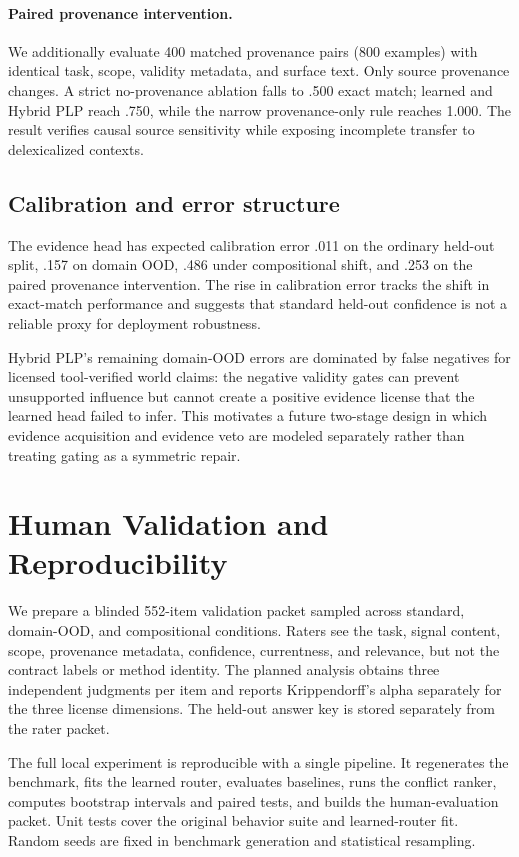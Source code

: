 \documentclass[10pt,twocolumn]{article}
\begin{document}
\paragraph{Paired provenance intervention.} We additionally evaluate 400 matched provenance pairs (800 examples) with identical task, scope, validity metadata, and surface text. Only source provenance changes. A strict no-provenance ablation falls to .500 exact match; learned and Hybrid PLP reach .750, while the narrow provenance-only rule reaches 1.000. The result verifies causal source sensitivity while exposing incomplete transfer to delexicalized contexts.


\subsection{Calibration and error structure}
The evidence head has expected calibration error .011 on the ordinary held-out split, .157 on domain OOD, .486 under compositional shift, and .253 on the paired provenance intervention. The rise in calibration error tracks the shift in exact-match performance and suggests that standard held-out confidence is not a reliable proxy for deployment robustness.

Hybrid PLP's remaining domain-OOD errors are dominated by false negatives for licensed tool-verified world claims: the negative validity gates can prevent unsupported influence but cannot create a positive evidence license that the learned head failed to infer. This motivates a future two-stage design in which evidence acquisition and evidence veto are modeled separately rather than treating gating as a symmetric repair.

\section{Human Validation and Reproducibility}
We prepare a blinded 552-item validation packet sampled across standard, domain-OOD, and compositional conditions. Raters see the task, signal content, scope, provenance metadata, confidence, currentness, and relevance, but not the contract labels or method identity. The planned analysis obtains three independent judgments per item and reports Krippendorff's alpha separately for the three license dimensions. The held-out answer key is stored separately from the rater packet.

The full local experiment is reproducible with a single pipeline. It regenerates the benchmark, fits the learned router, evaluates baselines, runs the conflict ranker, computes bootstrap intervals and paired tests, and builds the human-evaluation packet. Unit tests cover the original behavior suite and learned-router fit. Random seeds are fixed in benchmark generation and statistical resampling.
\end{document}
